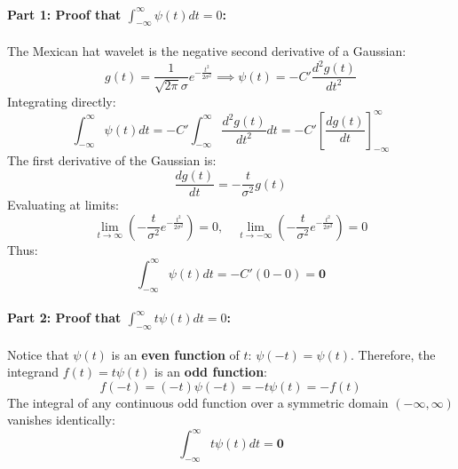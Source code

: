 \documentclass[11pt,twoside,openright]{book}
\begin{document}
\paragraph{Part 1: Proof that $\int_{-\infty}^\infty \psi(t) dt = 0$:}
The Mexican hat wavelet is the negative second derivative of a Gaussian:
\begin{equation*}
g(t) = \frac{1}{\sqrt{2\pi}\sigma} e^{-\frac{t^2}{2\sigma^2}} \implies \psi(t) = -C' \frac{d^2 g(t)}{dt^2}
\end{equation*}
Integrating directly:
\begin{equation*}
\int_{-\infty}^\infty \psi(t) dt = -C' \int_{-\infty}^\infty \frac{d^2 g(t)}{dt^2} dt = -C' \left[ \frac{d g(t)}{dt} \right]_{-\infty}^\infty
\end{equation*}
The first derivative of the Gaussian is:
\begin{equation*}
\frac{d g(t)}{dt} = -\frac{t}{\sigma^2} g(t)
\end{equation*}
Evaluating at limits:
\begin{equation*}
\lim_{t \to \infty} \left( -\frac{t}{\sigma^2} e^{-\frac{t^2}{2\sigma^2}} \right) = 0, \quad \lim_{t \to -\infty} \left( -\frac{t}{\sigma^2} e^{-\frac{t^2}{2\sigma^2}} \right) = 0
\end{equation*}
Thus:
\begin{equation*}
\int_{-\infty}^\infty \psi(t) dt = -C' (0 - 0) = \mathbf{0}
\end{equation*}

\paragraph{Part 2: Proof that $\int_{-\infty}^\infty t \psi(t) dt = 0$:}
Notice that $\psi(t)$ is an \textbf{even function} of $t$: $\psi(-t) = \psi(t)$.
Therefore, the integrand $f(t) = t \psi(t)$ is an \textbf{odd function}:
\begin{equation*}
f(-t) = (-t) \psi(-t) = -t \psi(t) = -f(t)
\end{equation*}
The integral of any continuous odd function over a symmetric domain $(-\infty, \infty)$ vanishes identically:
\begin{equation*}
\int_{-\infty}^\infty t \psi(t) dt = \mathbf{0}
\end{equation*}
\end{document}
